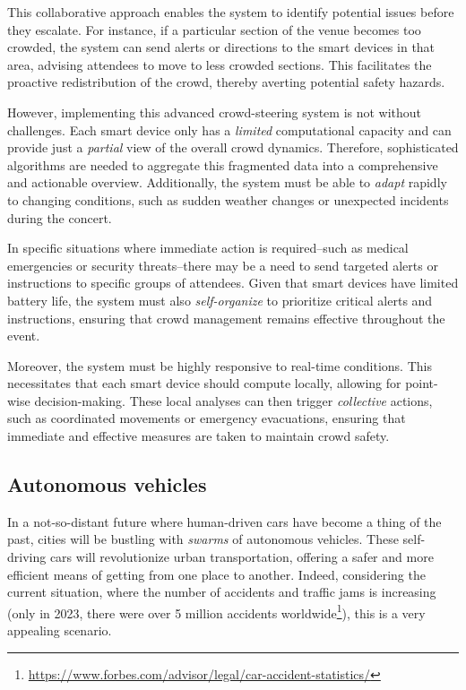 This collaborative approach enables the system to identify potential issues before they escalate. 
 For instance, if a particular section of the venue becomes too crowded, 
 the system can send alerts or directions to the smart devices in that area, 
 advising attendees to move to less crowded sections. 
 This facilitates the proactive redistribution of the crowd, 
 thereby averting potential safety hazards.

However, implementing this advanced crowd-steering system is not without challenges. 
 Each smart device only has a \emph{limited} computational capacity 
 and can provide just a \emph{partial} view of the overall crowd dynamics. 
Therefore, sophisticated algorithms are needed to aggregate 
 this fragmented data into a comprehensive and actionable overview. 
 Additionally, the system must be able to \emph{adapt} rapidly to changing conditions, 
 such as sudden weather changes or unexpected incidents during the concert.

In specific situations where immediate action is required--such as medical emergencies or security threats--there may be a need to send targeted alerts or instructions to specific groups of attendees. 
 Given that smart devices have limited battery life, 
 the system must also \emph{self-organize} to prioritize critical alerts and instructions, 
 ensuring that crowd management remains effective throughout the event.

Moreover, the system must be highly responsive to real-time conditions. 
 This necessitates that each smart device should compute locally, 
 allowing for point-wise decision-making. 
 These local analyses can then trigger \emph{collective} actions, 
 such as coordinated movements or emergency evacuations, 
 ensuring that immediate and effective measures are taken to maintain crowd safety.

\subsection{Autonomous vehicles}
In a not-so-distant future
 where human-driven cars have become a thing of the past, 
 cities will be bustling with \emph{swarms} of autonomous vehicles. 
% 
These self-driving cars will revolutionize urban transportation, 
 offering a safer and more efficient means of getting from one place to another. 
Indeed, considering the current situation, 
 where the number of accidents and traffic jams is increasing (only in 2023, there were over 5 million accidents worldwide\footnote{\url{https://www.forbes.com/advisor/legal/car-accident-statistics/}}), 
 this is a very appealing scenario.

